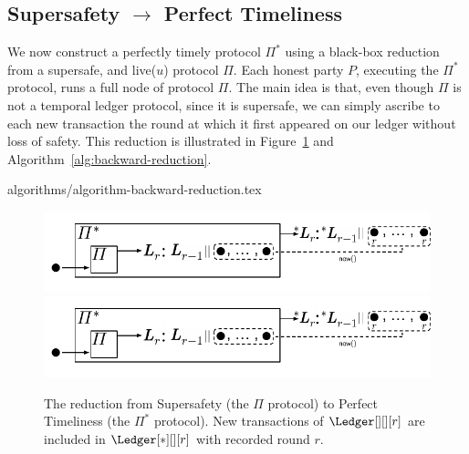 \subsection{Supersafety $\rightarrow$ Perfect Timeliness}\label{sec:backward-reduction}

We now construct a perfectly timely protocol $\Pi^*$
using a black-box reduction from a supersafe, and live($u$) protocol $\Pi$.
Each honest party $P$, executing the $\Pi^*$ protocol, runs a
full node of protocol $\Pi$.
The main idea is that, even though $\Pi$ is not a temporal ledger protocol,
since it is supersafe, we can simply
ascribe to each new transaction the round at which it first appeared on our ledger
without loss of safety.
This reduction is illustrated in Figure~\ref{fig:backward-reduction}
and Algorithm~\ref{alg:backward-reduction}.

{algorithms/algorithm-backward-reduction.tex}

\begin{figure}
  \centering
  \iflncs
    \includegraphics[width=0.9\columnwidth,keepaspectratio]{figures/backward-reduction.pdf}
  \fi
  \ifccs
    \includegraphics[width=1.4\columnwidth,keepaspectratio]{figures/backward-reduction.pdf}
  \fi
  \caption{The reduction from Supersafety
    (the $\Pi$ protocol) to Perfect Timeliness (the $\Pi^*$ protocol).
    New transactions of $\Ledger[][][r]$ are included in
    $\Ledger[*][][r]$ with recorded round $r$.
  }
 \label{fig:backward-reduction}
\end{figure}


